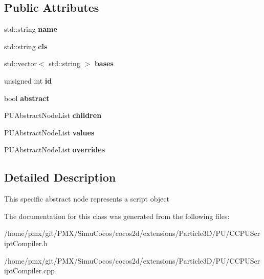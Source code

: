 \subsection*{Public Attributes}
\begin{DoxyCompactItemize}
\item 
\mbox{\label{classPUObjectAbstractNode_a1500832467a75565813f909d06a910bc}} 
std\+::string {\bfseries name}
\item 
\mbox{\label{classPUObjectAbstractNode_a1290461fac465dbb255bbac00592aed6}} 
std\+::string {\bfseries cls}
\item 
\mbox{\label{classPUObjectAbstractNode_a81f2228b07a5ad8f10638816afd80e08}} 
std\+::vector$<$ std\+::string $>$ {\bfseries bases}
\item 
\mbox{\label{classPUObjectAbstractNode_afc11bbfc98078b17ed938b1385a6bf02}} 
unsigned int {\bfseries id}
\item 
\mbox{\label{classPUObjectAbstractNode_a3035f3c2c329b8794e595fab62fb8508}} 
bool {\bfseries abstract}
\item 
\mbox{\label{classPUObjectAbstractNode_a38f5d39068e42aaa88e768346a28137a}} 
P\+U\+Abstract\+Node\+List {\bfseries children}
\item 
\mbox{\label{classPUObjectAbstractNode_a75c48f93349e27ee2b5a6b173413403f}} 
P\+U\+Abstract\+Node\+List {\bfseries values}
\item 
\mbox{\label{classPUObjectAbstractNode_a75b56d24c2ca3a7ea842faeffb325970}} 
P\+U\+Abstract\+Node\+List {\bfseries overrides}
\end{DoxyCompactItemize}


\subsection{Detailed Description}
This specific abstract node represents a script object 

The documentation for this class was generated from the following files\+:\begin{DoxyCompactItemize}
\item 
/home/pmx/git/\+P\+M\+X/\+Simu\+Cocos/cocos2d/extensions/\+Particle3\+D/\+P\+U/C\+C\+P\+U\+Script\+Compiler.\+h\item 
/home/pmx/git/\+P\+M\+X/\+Simu\+Cocos/cocos2d/extensions/\+Particle3\+D/\+P\+U/C\+C\+P\+U\+Script\+Compiler.\+cpp\end{DoxyCompactItemize}

